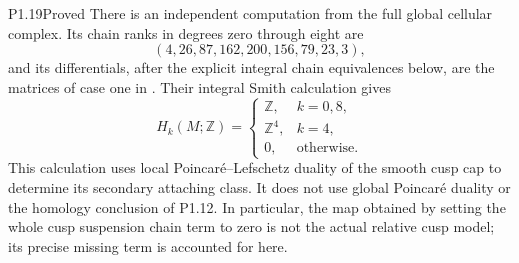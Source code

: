 \begin{statement}{P1.19}{Proved}
There is an independent computation from the full global cellular
complex.  Its chain ranks in degrees zero through eight are
\[
 (4,26,87,162,200,156,79,23,3),
\]
and its differentials, after the explicit integral chain equivalences
below, are the matrices of case one in
.
Their integral Smith calculation gives
\[
 H_k(M;\mathbb Z)=
 \begin{cases}
 \mathbb Z,&k=0,8,\\
 \mathbb Z^4,&k=4,\\
 0,&\text{otherwise}.
 \end{cases}
\]
This calculation uses local Poincar\'e--Lefschetz duality of the
smooth cusp cap to determine its secondary attaching class.  It does
not use global Poincar\'e duality or the homology conclusion of P1.12.
In particular, the map obtained by setting the whole cusp suspension
chain term to zero is not the actual relative cusp model; its precise
missing term is accounted for here.
\end{statement}
